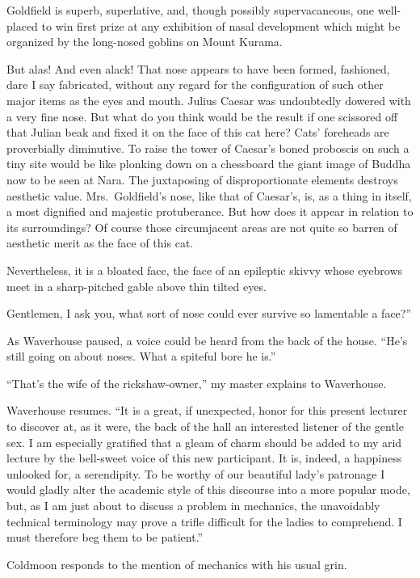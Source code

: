\documentclass[12pt, openright]{book}
\begin{document}
Goldfield is superb, superlative, and, though possibly supervacaneous,
one well-placed to win first prize at any exhibition of nasal
development which might be organized by the long-nosed goblins on Mount
Kurama.

But alas! And even alack! That nose appears to have been formed,
fashioned, dare I say fabricated, without any regard for the
configuration of such other major items as the eyes and mouth. Julius
Caesar was undoubtedly dowered with a very fine nose. But what do you
think would be the result if one scissored off that Julian beak and
fixed it on the face of this cat here? Cats' foreheads are proverbially
diminutive. To raise the tower of Caesar's boned proboscis on such a
tiny site would be like plonking down on a chessboard the giant image of
Buddha now to be seen at Nara. The juxtaposing of disproportionate
elements destroys aesthetic value. Mrs.~Goldfield's nose, like that of
Caesar's, is, as a thing in itself, a most dignified and majestic
protuberance. But how does it appear in relation to its surroundings? Of
course those circumjacent areas are not quite so barren of aesthetic
merit as the face of this cat.

Nevertheless, it is a bloated face, the face of an epileptic skivvy
whose eyebrows meet in a sharp-pitched gable above thin tilted eyes.

Gentlemen, I ask you, what sort of nose could ever survive so lamentable
a face?''

As Waverhouse paused, a voice could be heard from the back of the house.
``He's still going on about noses. What a spiteful bore he is.''

``That's the wife of the rickshaw-owner,'' my master explains to
Waverhouse.

Waverhouse resumes. ``It is a great, if unexpected, honor for this
present lecturer to discover at, as it were, the back of the hall an
interested listener of the gentle sex. I am especially gratified that a
gleam of charm should be added to my arid lecture by the bell-sweet
voice of this new participant. It is, indeed, a happiness unlooked for,
a serendipity. To be worthy of our beautiful lady's patronage I would
gladly alter the academic style of this discourse into a more popular
mode, but, as I am just about to discuss a problem in mechanics, the
unavoidably technical terminology may prove a trifle difficult for the
ladies to comprehend. I must therefore beg them to be patient.''

Coldmoon responds to the mention of mechanics with his usual grin.
\end{document}
